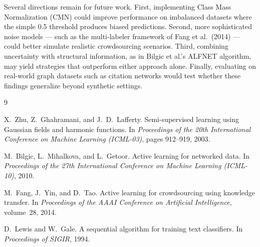 \documentclass{article}
\begin{document}
Several directions remain for future work. First, implementing Class Mass Normalization (CMN) could improve performance on imbalanced datasets where the simple 0.5 threshold produces biased predictions. Second, more sophisticated noise models --- such as the multi-labeler framework of Fang et al.\ (2014) --- could better simulate realistic crowdsourcing scenarios. Third, combining uncertainty with structural information, as in Bilgic et al.'s ALFNET algorithm, may yield strategies that outperform either approach alone. Finally, evaluating on real-world graph datasets such as citation networks would test whether these findings generalize beyond synthetic settings.


\begin{thebibliography}{9}

X.~Zhu, Z.~Ghahramani, and J.~D.~Lafferty.
\newblock Semi-supervised learning using {G}aussian fields and harmonic functions.
\newblock In \emph{Proceedings of the 20th International Conference on Machine Learning (ICML-03)}, pages 912--919, 2003.

M.~Bilgic, L.~Mihalkova, and L.~Getoor.
\newblock Active learning for networked data.
\newblock In \emph{Proceedings of the 27th International Conference on Machine Learning (ICML-10)}, 2010.

M.~Fang, J.~Yin, and D.~Tao.
\newblock Active learning for crowdsourcing using knowledge transfer.
\newblock In \emph{Proceedings of the AAAI Conference on Artificial Intelligence}, volume~28, 2014.

D.~Lewis and W.~Gale.
\newblock A sequential algorithm for training text classifiers.
\newblock In \emph{Proceedings of SIGIR}, 1994.

\end{thebibliography}
\end{document}

